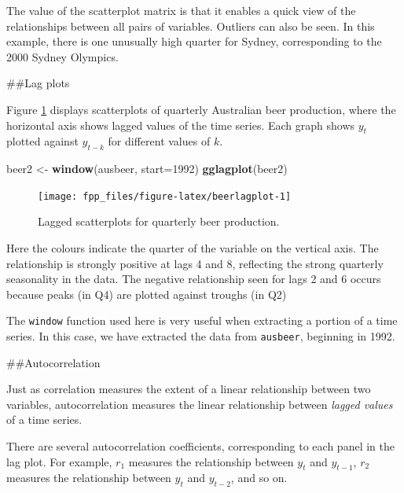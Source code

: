\documentclass[]{book}
\newenvironment{Shaded}{\begin{snugshade}}{\end{snugshade}}
\newcommand{\DataTypeTok}[1]{\textcolor[rgb]{0.13,0.29,0.53}{#1}}
\newcommand{\DecValTok}[1]{\textcolor[rgb]{0.00,0.00,0.81}{#1}}
\newcommand{\KeywordTok}[1]{\textcolor[rgb]{0.13,0.29,0.53}{\textbf{#1}}}
\newcommand{\NormalTok}[1]{#1}
\newcommand{\StringTok}[1]{\textcolor[rgb]{0.31,0.60,0.02}{#1}}
\begin{document}
The value of the scatterplot matrix is that it enables a quick view of the relationships between all pairs of variables. Outliers can also be seen. In this example, there is one unusually high quarter for Sydney, corresponding to the 2000 Sydney Olympics.

\#\#Lag plots

Figure \ref{fig:beerlagplot} displays scatterplots of quarterly Australian beer production, where the horizontal axis shows lagged values of the time series. Each graph shows \(y_{t}\) plotted against \(y_{t-k}\) for different values of \(k\).

\begin{Shaded}
\begin{Highlighting}[]
\NormalTok{beer2 <-}\StringTok{ }\KeywordTok{window}\NormalTok{(ausbeer, }\DataTypeTok{start=}\DecValTok{1992}\NormalTok{)}
\KeywordTok{gglagplot}\NormalTok{(beer2)}
\end{Highlighting}
\end{Shaded}

\begin{figure}

{\centering \texttt{[image: fpp\_files/figure-latex/beerlagplot-1]} 

}

\caption{Lagged scatterplots for quarterly beer production.}\label{fig:beerlagplot}
\end{figure}

Here the colours indicate the quarter of the variable on the vertical axis.
The relationship is strongly positive at lags 4 and 8, reflecting the strong quarterly seasonality in the data. The negative relationship seen for lags 2 and 6 occurs because peaks (in Q4) are plotted against troughs (in Q2)

The \texttt{window} function used here is very useful when extracting a portion of a time series. In this case, we have extracted the data from \texttt{ausbeer}, beginning in 1992.

\#\#Autocorrelation

Just as correlation measures the extent of a linear relationship between two variables, autocorrelation measures the linear relationship between \emph{lagged values} of a time series.

There are several autocorrelation coefficients, corresponding to each panel in the lag plot. For example, \(r_{1}\) measures the relationship between \(y_{t}\) and \(y_{t-1}\), \(r_{2}\) measures the relationship between \(y_{t}\) and \(y_{t-2}\), and so on.
\end{document}
